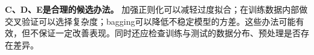 \textbf{C、D、E是合理的候选办法。} 加强正则化可以减轻过度拟合；在训练数据内部做交叉验证可以选择复杂度；bagging可以降低不稳定模型的方差。这些办法可能有效，但不保证一定改善表现。同时还应检查训练与测试的数据分布、预处理是否存在差异。
